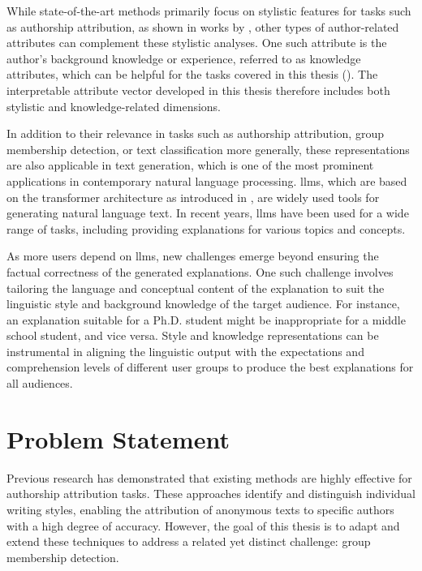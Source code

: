 While state-of-the-art methods primarily focus on stylistic features for tasks such as authorship attribution, as shown in works by \citet{alshomaryLatentSpaceInterpretation2024, patelLearningInterpretableStyle2023, konenStyleVectorsSteering2024, zhu-etal-2024-styleflow}, other types of author-related attributes can complement these stylistic analyses. One such attribute is the author's background knowledge or experience, referred to as knowledge attributes, which can be helpful for the tasks covered in this thesis (\cite{jin-etal-2022-deep}). The interpretable attribute vector developed in this thesis therefore includes both stylistic and knowledge-related dimensions.

In addition to their relevance in tasks such as authorship attribution, group membership detection, or text classification more generally, these representations are also applicable in text generation, which is one of the most prominent applications in contemporary natural language processing. \Acp{llm}, which are based on the transformer architecture as introduced in \citet{NIPS2017_3f5ee243}, are widely used tools for generating natural language text. In recent years, \acp{llm} have been used for a wide range of tasks, including providing explanations for various topics and concepts.

As more users depend on \acp{llm}, new challenges emerge beyond ensuring the factual correctness of the generated explanations. One such challenge involves tailoring the language and conceptual content of the explanation to suit the linguistic style and background knowledge of the target audience. For instance, an explanation suitable for a Ph.D. student might be inappropriate for a middle school student, and vice versa. Style and knowledge representations can be instrumental in aligning the linguistic output with the expectations and comprehension levels of different user groups to produce the best explanations for all audiences.


\section{Problem Statement}
\label{sec:introduction:problemStatement}
Previous research has demonstrated that existing methods are highly effective for authorship attribution tasks. These approaches identify and distinguish individual writing styles, enabling the attribution of anonymous texts to specific authors with a high degree of accuracy. However, the goal of this thesis is to adapt and extend these techniques to address a related yet distinct challenge: group membership detection.

